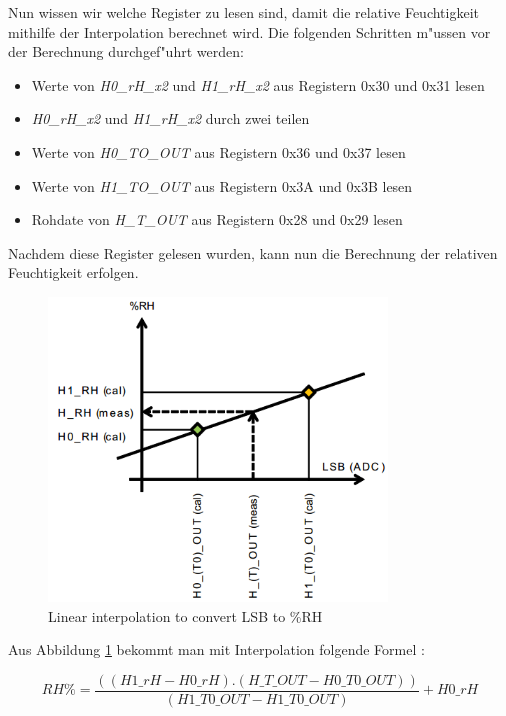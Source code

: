 Nun wissen wir welche Register zu lesen sind, damit die relative 
Feuchtigkeit mithilfe der Interpolation berechnet wird. Die folgenden 
Schritten m"ussen vor der Berechnung durchgef"uhrt werden:

\begin{itemize}
	\item Werte von \textit{H0\_rH\_x2} und \textit{H1\_rH\_x2} aus 
	Registern 0x30 und 0x31 lesen 
	\item \textit{H0\_rH\_x2} und \textit{H1\_rH\_x2} durch zwei teilen
	\item Werte von \textit{H0\_TO\_OUT} aus Registern 0x36 und 0x37 
	lesen 
	\item Werte von \textit{H1\_TO\_OUT} aus Registern 0x3A und 0x3B 
	lesen
	\item Rohdate von \textit{H\_T\_OUT} aus Registern 0x28 und 0x29 
	lesen
\end{itemize}

Nachdem diese Register gelesen wurden, kann nun die Berechnung der 
relativen Feuchtigkeit erfolgen.

\begin{figure}[h]
	\centering
	\includegraphics[width=9cm]{source/images/rH}
	\caption{Linear interpolation to convert \ac{LSB} to \%\ac{RH}
	\cite{HTS221}}\label{fig:rH}
\end{figure}

Aus Abbildung \ref{fig:rH} bekommt man mit Interpolation folgende 
Formel \cite{HTS221}:

\begin{center}
	\[
	RH\% = \frac{((H1\_rH - H0\_rH) . (H\_T\_OUT - 
	H0\_T0\_OUT))}{(H1\_T0\_OUT - H1\_T0\_OUT) } + H0\_rH  
	\]\label{HumFormel}
\end{center}

